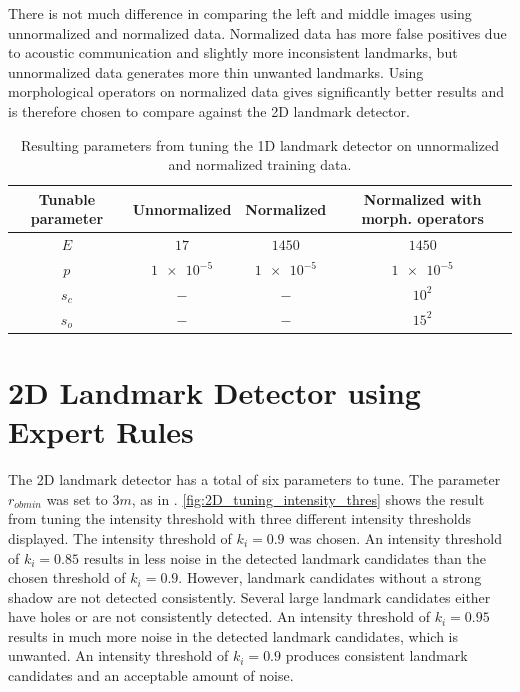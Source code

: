 There is not much difference in comparing the left and middle images using unnormalized and normalized data. Normalized data has more false positives due to acoustic communication and slightly more inconsistent landmarks, but unnormalized data generates more thin unwanted landmarks. Using morphological operators on normalized data gives significantly better results and is therefore chosen to compare against the 2D landmark detector.

\begin{table} [h!]
    \caption{Resulting parameters from tuning the 1D landmark detector on unnormalized and normalized training data.}
    \centering
    \begin{tabular}{cccc}
        \hline
        \textbf{Tunable parameter} & \textbf{Unnormalized} & \textbf{Normalized} & \textbf{Normalized with morph. operators} \\ \hline
        $E$                        & $17$                  & $1450$              & $1450$                                    \\
        $p$                        & $\num{1e-5}$          & $\num{1e-5}$        & $\num{1e-5}$                              \\
        $s_c$                      & $-$                   & $-$                 & $10^2$                                    \\
        $s_o$                      & $-$                   & $-$                 & $15^2$                                    \\ \hline
    \end{tabular}
    \label{tab:1D_parameters}
\end{table}

\section{2D Landmark Detector using Expert Rules}

The 2D landmark detector has a total of six parameters to tune. The parameter $r_{ob min}$ was set to $3 m $, as in \cite{Leblond2019SonarProject}. \cref{fig:2D_tuning_intensity_thres} shows the result from tuning the intensity threshold with three different intensity thresholds displayed. The intensity threshold of $k_i = 0.9$ was chosen. An intensity threshold of $k_i = 0.85$ results in less noise in the detected landmark candidates than the chosen threshold of $k_i = 0.9$. However, landmark candidates without a strong shadow are not detected consistently. Several large landmark candidates either have holes or are not consistently detected. An intensity threshold of $k_i = 0.95$ results in much more noise in the detected landmark candidates, which is unwanted. An intensity threshold of $k_i = 0.9$ produces consistent landmark candidates and an acceptable amount of noise. 

